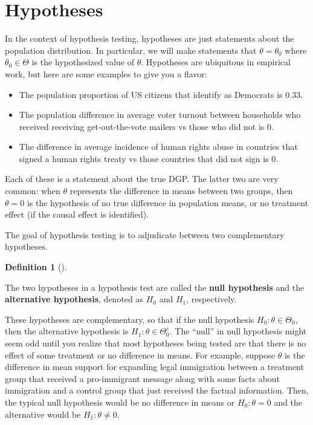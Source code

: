 \documentclass[
  letterpaper,
  DIV=11,
  numbers=noendperiod]{scrreprt}
\providecommand{\tightlist}{%
  \setlength{\itemsep}{0pt}\setlength{\parskip}{0pt}}\usepackage{longtable,booktabs,array}
\theoremstyle{definition}
\newtheorem{definition}{Definition}[chapter]
\theoremstyle{plain}
\theoremstyle{definition}
\theoremstyle{remark}
\begin{document}
\hypertarget{hypotheses}{%
\section{Hypotheses}\label{hypotheses}}

In the context of hypothesis testing, hypotheses are just statements
about the population distribution. In particular, we will make
statements that \(\theta = \theta_0\) where \(\theta_0 \in \Theta\) is
the hypothesized value of \(\theta\). Hypotheses are ubiquitous in
empirical work, but here are some examples to give you a flavor:

\begin{itemize}
\tightlist
\item
  The population proportion of US citizens that identify as Democrats is
  0.33.
\item
  The population difference in average voter turnout between households
  who received receiving get-out-the-vote mailers vs those who did not
  is 0.
\item
  The difference in average incidence of human rights abuse in countries
  that signed a human rights treaty vs those countries that did not sign
  is 0.
\end{itemize}

Each of these is a statement about the true DGP. The latter two are very
common: when \(\theta\) represents the difference in means between two
groups, then \(\theta = 0\) is the hypothesis of no true difference in
population means, or no treatment effect (if the causal effect is
identified).

The goal of hypothesis testing is to adjudicate between two
complementary hypotheses.

\leavevmode{}%
\begin{definition}[]\label{def-null}

The two hypotheses in a hypothesis test are called the \textbf{null
hypothesis} and the \textbf{alternative hypothesis}, denoted as \(H_0\)
and \(H_1\), respectively.

\end{definition}

These hypotheses are complementary, so that if the null hypothesis
\(H_0: \theta \in \Theta_0\), then the alternative hypothesis is
\(H_1: \theta \in \Theta_0^c\). The ``null'' in null hypothesis might
seem odd until you realize that most hypotheses being tested are that
there is no effect of some treatment or no difference in means. For
example, suppose \(\theta\) is the difference in mean support for
expanding legal immigration between a treatment group that received a
pro-immigrant message along with some facts about immigration and a
control group that just received the factual information. Then, the
typical null hypothesis would be no difference in means or
\(H_0: \theta = 0\) and the alternative would be \(H_1: \theta \neq 0\).
\end{document}
